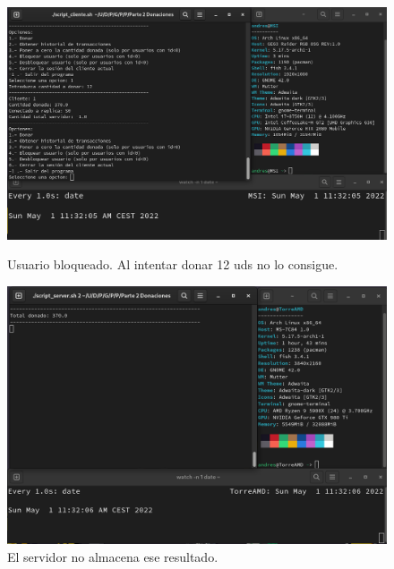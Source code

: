\documentclass{article}
\begin{document}
\begin{figure}[H]
    \centering
    \begin{minipage}[H]{0.45\textwidth}
        \centering
        \includegraphics[width=\textwidth]{imagenes/multiples ordenadores/Cliente/Screenshot from 2022-05-01 11-32-08.png}
        \caption{Usuario bloqueado. Al intentar donar 12 uds no lo consigue.}
    \end{minipage}
    \hfill
    \begin{minipage}[H]{0.45\textwidth}
        \centering
        \includegraphics[width=\textwidth]{imagenes/multiples ordenadores/Servidor/Screenshot from 2022-05-01 11-32-09.png}
        \caption{El servidor no almacena ese resultado.}
    \end{minipage}
\end{figure}
\end{document}
